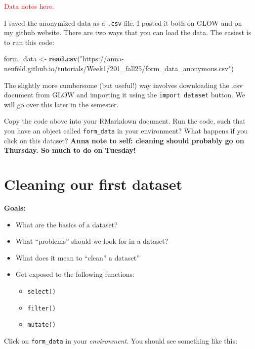 \documentclass[
]{article}
\newenvironment{Shaded}{\begin{snugshade}}{\end{snugshade}}
\newcommand{\FunctionTok}[1]{\textcolor[rgb]{0.13,0.29,0.53}{\textbf{#1}}}
\newcommand{\NormalTok}[1]{#1}
\newcommand{\OtherTok}[1]{\textcolor[rgb]{0.56,0.35,0.01}{#1}}
\newcommand{\StringTok}[1]{\textcolor[rgb]{0.31,0.60,0.02}{#1}}
\providecommand{\tightlist}{%
  \setlength{\itemsep}{0pt}\setlength{\parskip}{0pt}}
\begin{document}
\textcolor{red}{Data notes here.}

I saved the anonymized data as a \texttt{.csv} file. I posted it both on
GLOW and on my github website. There are two ways that you can load the
data. The easiest is to run this code:

\begin{Shaded}
\begin{Highlighting}[]
\NormalTok{form\_data }\OtherTok{\textless{}{-}} \FunctionTok{read.csv}\NormalTok{(}\StringTok{"https://anna{-}neufeld.github.io/tutorials/Week1/201\_fall25/form\_data\_anonymous.csv"}\NormalTok{)}
\end{Highlighting}
\end{Shaded}

The slightly more cumbersome (but useful!) way involves downloading the
.csv document from GLOW and importing it using the
\texttt{import\ dataset} button. We will go over this later in the
semester.

Copy the code above into your RMarkdown document. Run the code, such
that you have an object called \texttt{form\_data} in your environment?
What happens if you click on this dataset? \textbf{Anna note to self:
cleaning should probably go on Thursday. So much to do on Tuesday!}

\section{Cleaning our first dataset}\label{cleaning-our-first-dataset}

\label{boxedtext}
\textbf{Goals:}

\begin{itemize}
\tightlist
\item
  What are the basics of a dataset?
\item
  What ``problems'' should we look for in a dataset?
\item
  What does it mean to ``clean'' a dataset''
\item
  Get exposed to the following functions:

  \begin{itemize}
  \tightlist
  \item
    \texttt{select()}
  \item
    \texttt{filter()}
  \item
    \texttt{mutate()}
  \end{itemize}
\end{itemize}

Click on \texttt{form\_data} in your \emph{environment}. You should see
something like this:
\end{document}

